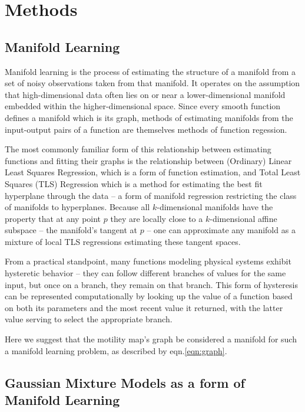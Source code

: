 \documentclass[conference]{IEEEtran}
\begin{document}
\section{Methods}

\subsection{Manifold Learning}

Manifold learning is the process of estimating the structure of a manifold from a set of noisy observations taken from that manifold. 
It operates on the assumption that high-dimensional data often lies on or near a lower-dimensional manifold embedded within the higher-dimensional space.
Since every smooth function defines a manifold which is its graph, methods of estimating manifolds from the input-output pairs of a function are themselves methods of function regession. 

The most commonly familiar form of this relationship between estimating functions and fitting their graphs is the relationship between (Ordinary) Linear Least Squares Regression, which is a form of function estimation, and Total Least Squares (TLS) Regression which is a method for estimating the best fit hyperplane through the data -- a form of manifold regression restricting the class of manifolds to hyperplanes.
Because all $k$-dimensional manifolds have the property that at any point $p$ they are locally close to a $k$-dimensional affine subspace -- the manifold's tangent at $p$ -- one can approximate any manifold as a mixture of local TLS regressions estimating these tangent spaces.

From a practical standpoint, many functions modeling physical systems exhibit hysteretic behavior -- they can follow different branches of values for the same input, but once on a branch, they remain on that branch.
This form of hysteresis can be represented computationally by looking up the value of a function based on both its parameters and the most recent value it returned, with the latter value serving to select the appropriate branch.

Here we suggest that the motility map's graph be considered a manifold for such a manifold learning problem, as described by eqn.\ref{eqn:graph}.

\subsection{Gaussian Mixture Models as a form of Manifold Learning}
\end{document}
